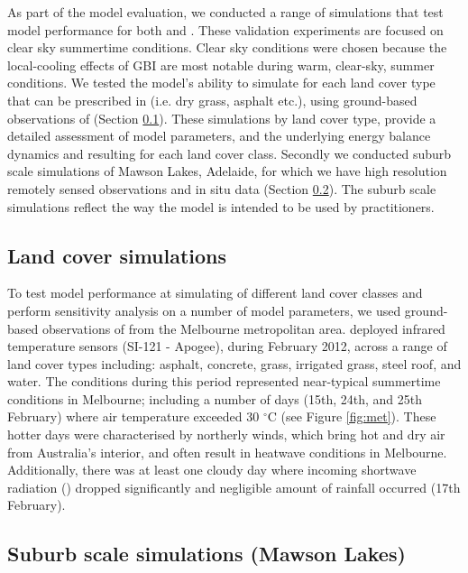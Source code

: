 \documentclass[final,3p,times,authoryear]{elsarticle}
\newcommand{\degreeC}{\ensuremath{^\circ}C }
\begin{document}
As part of the model evaluation, we conducted a range of simulations that test model performance for both  and . These validation experiments are focused on clear sky summertime conditions. Clear sky conditions were chosen because the local-cooling effects of GBI are most notable during warm, clear-sky, summer conditions. We tested the model's ability to simulate  for each land cover type that can be prescribed in  (i.e. dry grass, asphalt etc.), using ground-based observations of  (Section \ref{sec:landcoversim}). These simulations by land cover type, provide a detailed assessment of model parameters, and the underlying energy balance dynamics and resulting  for each land cover class. Secondly we conducted suburb scale simulations of Mawson Lakes, Adelaide, for which we have high resolution remotely sensed  observations and in situ  data (Section \ref{sec:suburbsim}).  The suburb scale simulations reflect the way the model is intended to be used by practitioners.



\subsection{Land cover simulations}\label{sec:landcoversim} 

To test model performance at simulating  of different land cover classes and perform sensitivity analysis on a number of model parameters, we used ground-based observations of  from the Melbourne metropolitan area. \cite{Coutts2016a} deployed infrared temperature sensors (SI-121 - Apogee), during February 2012, across a range of land cover types including: asphalt, concrete, grass, irrigated grass, steel roof, and water. The conditions during this period represented near-typical summertime conditions in Melbourne; including a number of days (15th, 24th, and 25th February) where air temperature exceeded 30 \degreeC (see Figure \ref{fig:met}). These hotter days were characterised by northerly winds, which bring hot and dry air from Australia's interior, and often result in heatwave conditions in Melbourne. Additionally, there was at least one cloudy day where incoming shortwave radiation () dropped significantly and negligible amount of rainfall occurred (17th February). 




\subsection{Suburb scale simulations (Mawson Lakes)}\label{sec:suburbsim} 
 
\end{document}
